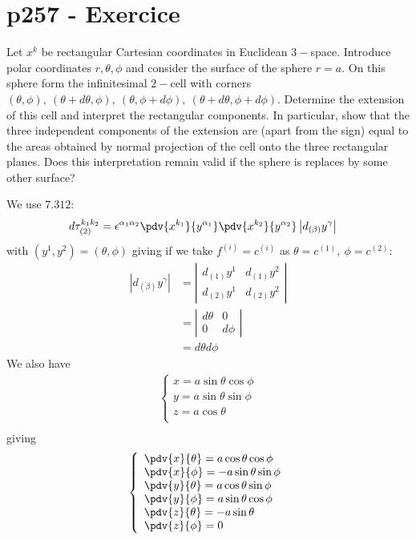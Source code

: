 \section{p257 - Exercice }
\begin{tcolorbox}
Let $x^k$ be rectangular Cartesian coordinates in Euclidean $3-$space. Introduce polar coordinates $r,\theta,\phi$ and consider the surface of the sphere $r=a$. On this sphere form the infinitesimal $2-$cell with corners $(\theta,\phi),\ (\theta+d\theta,\phi),\ (\theta,\phi+d\phi),\ (\theta+d\theta,\phi+d\phi)$. Determine the extension of this cell and interpret the rectangular components. In particular, show that the three independent components of the extension are (apart from the sign) equal to the areas obtained by normal projection of the cell onto the three rectangular planes. Does this interpretation remain valid if the sphere is replaces by some other surface?
\end{tcolorbox}
We use $\mathbf{7.312}$:
\begin{align}
d\tau_{(2)}^{k_1k_2}&= \epsilon^{\alpha_1\alpha_2}\pdv{x^{k_1}}{y^{\alpha_1}}\pdv{x^{k_2}}{y^{\alpha_2}}\left|d_{(\beta)}y^{\gamma}\right|
\end{align}
with $(y^1, y^2)= (\theta,\phi)$ giving if we take $f^{(i)}=c^{(i)} $ as $\theta=c^{(1)},\ \phi =c^{(2)} $:
\begin{align}
\left|d_{(\beta)}y^{\gamma}\right|&=\left|\begin{matrix}d_{(1)}y^{1}&d_{(1)}y^{2}\\
d_{(2)}y^{1}&d_{(2)}y^{2}\end{matrix}\right|\\
&=\left|\begin{matrix}d{\theta}&0\\
0&d{\phi}\end{matrix}\right|\\
&= d{\theta}d{\phi}
\end{align}
We also have
\begin{align}
\left\{\begin{array}{l}
x= a\sin{\theta}\cos{\phi}\\
y= a\sin{\theta}\sin{\phi}\\
z= a\cos{\theta}\\
\end{array}\right.\\
\end{align}
giving
\begin{align}
\left\{\begin{array}{l}
\pdv{x}{\theta}= a\cos{\theta}\cos{\phi}\\
\pdv{x}{\phi}= -a\sin{\theta}\sin{\phi}\\
\pdv{y}{\theta}= a\cos{\theta}\sin{\phi}\\
\pdv{y}{\phi}=  a\sin{\theta}\cos{\phi}\\
\pdv{z}{\theta}= -a\sin{\theta}\\
\pdv{z}{\phi}= 0\\
\end{array}\right.\\
\end{align}

